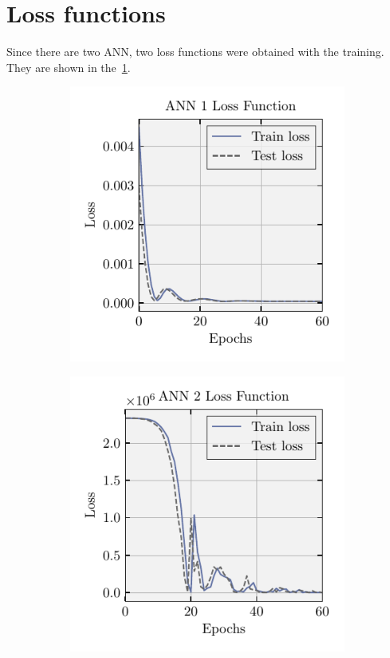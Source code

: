\section{Loss functions}

Since there are two ANN, two loss functions were obtained with the training. They are shown in the~\cref{fig:test_loss}.

\begin{figure}[!htb]
    \centering
    \caption[Loss Functions Behavior]{Loss Functions Behavior. The total number of epochs is 500 and was omitted because they were approximating a straight line.}
    \begin{subfigure}{0.49\textwidth}
        \centering
        \includegraphics{../codes/models/model_alpha/figures/ann1_loss_function.pdf}
    \end{subfigure}
    \hfill
    \begin{subfigure}{0.49\textwidth}
        \centering
        \includegraphics{../codes/models/model_alpha/figures/ann2_loss_function.pdf}
    \end{subfigure}

    \label{fig:test_loss}
\end{figure}

